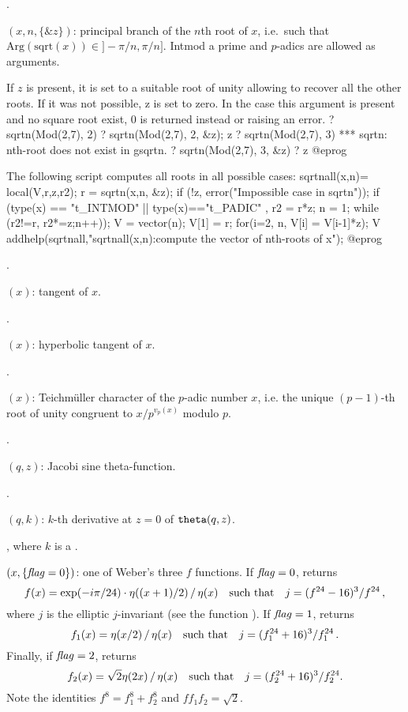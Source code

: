 .

$(x,n,\{\&z\})$: principal branch of the $n$th root of $x$,
i.e.~such that $\text{Arg}(\text{sqrt}(x))\in{} ]-\pi/n, \pi/n]$. Intmod
a prime and $p$-adics are allowed as arguments.

If $z$ is present, it is set to a suitable root of unity allowing to
recover all the other roots. If it was not possible, z is
set to zero. In the case this argument is present and no square root exist,
$0$ is returned instead or raising an error.
\bprog
? sqrtn(Mod(2,7), 2)
? sqrtn(Mod(2,7), 2, &z); z
? sqrtn(Mod(2,7), 3)
  *** sqrtn: nth-root does not exist in gsqrtn.
? sqrtn(Mod(2,7), 3,  &z)
? z
@eprog

The following script computes all roots in all possible cases:
\bprog
sqrtnall(x,n)=
{
  local(V,r,z,r2);
  r = sqrtn(x,n, &z);
  if (!z, error("Impossible case in sqrtn"));
  if (type(x) == "t_INTMOD" || type(x)=="t_PADIC" ,
    r2 = r*z; n = 1;
    while (r2!=r, r2*=z;n++));
  V = vector(n); V[1] = r;
  for(i=2, n, V[i] = V[i-1]*z);
  V
}
addhelp(sqrtnall,"sqrtnall(x,n):compute the vector of nth-roots of x");
@eprog\noindent

.

$(x)$: tangent of $x$.

.

$(x)$: hyperbolic tangent of $x$.

.

$(x)$: Teichm\"uller character of the $p$-adic number
$x$, i.e. the unique $(p-1)$-th root of unity congruent to $x / p^{v_p(x)}$
modulo $p$.

.

$(q,z)$: Jacobi sine theta-function.

.

$(q,k)$: $k$-th derivative at $z=0$ of
${\tt theta}(q,z)$.

, where $k$ is a .

$(x,\{\hbox{\it f\kern0pt lag\/}=0\})$: one of Weber's three $f$ functions.
If $\hbox{\it f\kern0pt lag\/}=0$, returns
$$f(x)=\exp(-i\pi/24)\cdot\eta((x+1)/2)\,/\,\eta(x) \quad\hbox{such that}\quad
j=(f^{24}-16)^3/f^{24}\,,$$
where $j$ is the elliptic $j$-invariant  (see the function ).
If $\hbox{\it f\kern0pt lag\/}=1$, returns
$$f_1(x)=\eta(x/2)\,/\,\eta(x)\quad\hbox{such that}\quad
j=(f_1^{24}+16)^3/f_1^{24}\,.$$
Finally, if $\hbox{\it f\kern0pt lag\/}=2$, returns
$$f_2(x)=\sqrt{2}\eta(2x)\,/\,\eta(x)\quad\hbox{such that}\quad
j=(f_2^{24}+16)^3/f_2^{24}.$$
Note the identities $f^8=f_1^8+f_2^8$ and $ff_1f_2=\sqrt2$.

